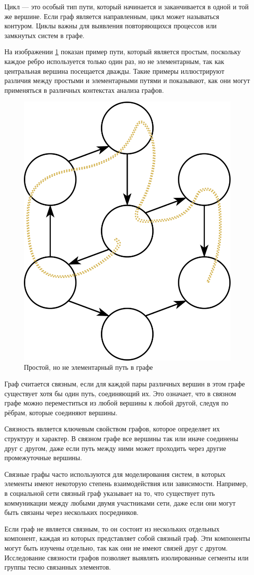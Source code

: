 Цикл — это особый тип пути, который начинается и заканчивается в одной и той же вершине. Если граф является направленным, цикл может называться контуром. Циклы важны для выявления повторяющихся процессов или замкнутых систем в графе.

На изображении \ref{fig:path_example} показан пример пути, который является простым, поскольку каждое ребро используется только один раз, но не элементарным, так как центральная вершина посещается дважды. Такие примеры иллюстрируют различия между простыми и элементарными путями и показывают, как они могут применяться в различных контекстах анализа графов.


\begin{figure}[H]
	\begin{center}
		\includegraphics[width=0.3\linewidth]{src/img/1/graph_path.png}
		\caption{Простой, но не элементарный путь в графе}
		\label{fig:path_example}
	\end{center}
\end{figure}

Граф считается связным, если для каждой пары различных вершин в этом графе существует хотя бы один путь, соединяющий их. Это означает, что в связном графе можно переместиться из любой вершины к любой другой, следуя по рёбрам, которые соединяют вершины.

Связность является ключевым свойством графов, которое определяет их структуру и характер. В связном графе все вершины так или иначе соединены друг с другом, даже если путь между ними может проходить через другие промежуточные вершины.

Связные графы часто используются для моделирования систем, в которых элементы имеют некоторую степень взаимодействия или зависимости. Например, в социальной сети связный граф указывает на то, что существует путь коммуникации между любыми двумя участниками сети, даже если они могут быть связаны через нескольких посредников.

Если граф не является связным, то он состоит из нескольких отдельных компонент, каждая из которых представляет собой связный граф. Эти компоненты могут быть изучены отдельно, так как они не имеют связей друг с другом. Исследование связности графов позволяет выявлять изолированные сегменты или группы тесно связанных элементов.



